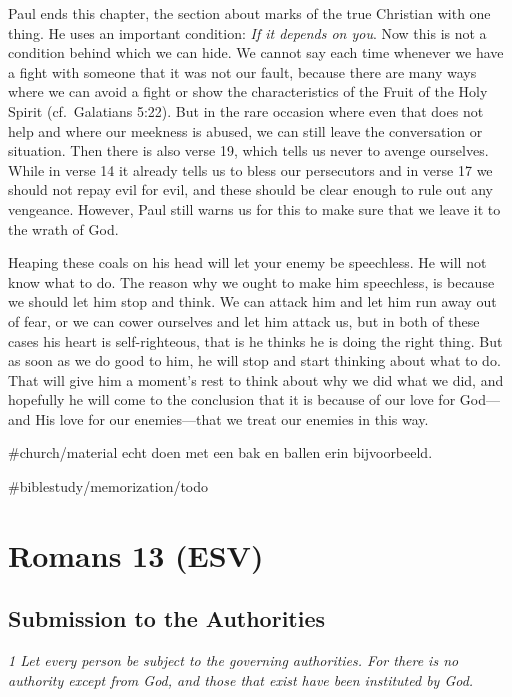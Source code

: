 Paul ends this chapter, the section about marks of the true Christian
with one thing. He uses an important condition: \emph{If it depends on
you}. Now this is not a condition behind which we can hide. We cannot
say each time whenever we have a fight with someone that it was not our
fault, because there are many ways where we can avoid a fight or show
the characteristics of the Fruit of the Holy Spirit (cf.~Galatians
5:22). But in the rare occasion where even that does not help and where
our meekness is abused, we can still leave the conversation or
situation. Then there is also verse 19, which tells us never to avenge
ourselves. While in verse 14 it already tells us to bless our
persecutors and in verse 17 we should not repay evil for evil, and these
should be clear enough to rule out any vengeance. However, Paul still
warns us for this to make sure that we leave it to the wrath of God.

Heaping these coals on his head will let your enemy be speechless. He
will not know what to do. The reason why we ought to make him
speechless, is because we should let him stop and think. We can attack
him and let him run away out of fear, or we can cower ourselves and let
him attack us, but in both of these cases his heart is self-righteous,
that is he thinks he is doing the right thing. But as soon as we do good
to him, he will stop and start thinking about what to do. That will give
him a moment's rest to think about why we did what we did, and hopefully
he will come to the conclusion that it is because of our love for
God---and His love for our enemies---that we treat our enemies in this
way.

\#church/material echt doen met een bak en ballen erin bijvoorbeeld.

\#biblestudy/memorization/todo

\newpage

\hypertarget{romans-13-esv}{%
\section{Romans 13 (ESV)}\label{romans-13-esv}}
\vspace{10.5cm}
\subsection{Submission to the Authorities} 
\emph{1 Let every person be
subject to the governing authorities. For there is no authority except
from God, and those that exist have been instituted by God.} 
\\

